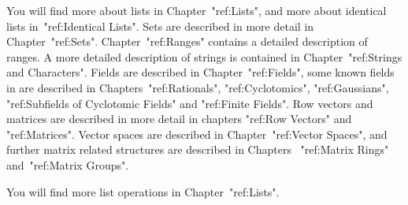 % 
% 
You will find more about lists in Chapter~"ref:Lists",
and more about identical lists in~"ref:Identical Lists".
% 
Sets are described in more detail in Chapter~"ref:Sets".
% 
Chapter~"ref:Ranges" contains a detailed description of ranges.
% 
A more detailed description of strings is contained in
Chapter~"ref:Strings and Characters".
% 
% 
Fields are described in Chapter~"ref:Fields",
some known fields in {\GAP} are described in Chapters~"ref:Rationals",
"ref:Cyclotomics", "ref:Gaussians", "ref:Subfields of Cyclotomic  Fields"
and "ref:Finite Fields".
Row vectors and matrices are described in more detail in chapters
"ref:Row Vectors" and "ref:Matrices".
Vector spaces are described in Chapter~"ref:Vector Spaces",
and further matrix related structures are described in Chapters~
"ref:Matrix Rings" and~"ref:Matrix Groups".
% 

% 
You will find more list operations in Chapter~"ref:Lists".


